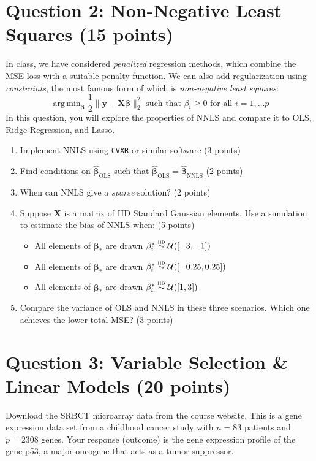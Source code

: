 \documentclass[10pt]{article}
\newcommand{\bX}{\bm{X}}
\newcommand{\by}{\bm{y}}
\newcommand{\bbeta}{\bm{\beta}}
\DeclareMathOperator{\argmin}{arg\,min}
\begin{document}
\section*{Question 2: Non-Negative Least Squares (15 points)}
In class, we have considered \emph{penalized} regression methods, which combine the MSE loss with a suitable penalty function. We can also add regularization using \emph{constraints}, the most famous form of which is \emph{non-negative least squares}: 
\[\argmin_{\bbeta} \frac{1}{2} \|\by - \bX\bbeta\|_2^2 \text{ such that } \beta_i \geq 0 \text{ for all } i=1, \dots p\]
In this question, you will explore the properties of NNLS and compare it to OLS, Ridge Regression, and Lasso. 

\begin{enumerate}[label=Q2(\alph*).]
    \item Implement NNLS using \texttt{CVXR} or similar software (3 points)
    \item Find conditions on $\hat{\bbeta}_{\text{OLS}}$ such that $\hat{\bbeta}_{\text{OLS}} = \hat{\bbeta}_{\text{NNLS}}$ (2 points)
    \item When can NNLS give a \emph{sparse} solution? (2 points)
    \item Suppose $\bX$ is a matrix of IID Standard Gaussian elements. Use a simulation to estimate the bias of NNLS when: 
    (5 points)
    \begin{itemize}
      \item All elements of $\bbeta_*$ are drawn $\beta^*_i \buildrel{\textsc{iid}}\over\sim\mathcal{U}([-3, -1])$
      \item  All elements of $\bbeta_*$ are drawn $\beta^*_i \buildrel{\textsc{iid}}\over\sim\mathcal{U}([-0.25, 0.25])$
      \item  All elements of $\bbeta_*$ are drawn $\beta^*_i \buildrel{\textsc{iid}}\over\sim\mathcal{U}([1, 3])$
    \end{itemize}
    \item Compare the variance of OLS and NNLS in these three scenarios. Which one achieves the lower total MSE? (3 points)
\end{enumerate}

\section*{Question 3: Variable Selection \& Linear Models (20 points)}

Download the SRBCT microarray data from the course website. This is a gene expression data set from a childhood cancer study with $n= 83$ patients and $p= 2308$ genes. Your response (outcome) is the gene expression profile of the gene p53, a major oncogene that acts as a tumor suppressor. 
\end{document}
